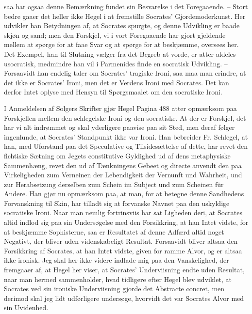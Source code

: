 \documentclass[12pt,a4paper]{article}
\begin{document}
saa har ogsaa denne Bemærkning fundet sin Besvarelse i det Foregaaende. – Stort bedre gaaer det heller ikke Hegel i at fremstille Socrates' Gjordemoderkunst. Her udvikler han Betydningen af, at Socrates spurgte, og denne Udvikling er baade skjøn og sand; men den Forskjel, vi i vort Foregaaende har gjort gjeldende mellem at spørge for at faae Svar og at spørge for at beskjæmme, oversees her. Det Exempel, han til Slutning vælger fra det Begreb at vorde, er atter aldeles usocratisk, medmindre han vil i Parmenides finde en socratisk Udvikling. – Forsaavidt han endelig taler om Socrates' tragiske Ironi, saa maa man erindre, at det ikke er Socrates' Ironi, men det er Verdens Ironi med Socrates. Det kan derfor Intet oplyse med Hensyn til Spørgsmaalet om den socratiske Ironi.

I Anmeldelsen af Solgers Skrifter gjør Hegel Pagina 488 atter opmærksom paa Forskjellen mellem den schlegelske Ironi og den socratiske. At der er Forskjel, det har vi alt indrømmet og skal yderligere paavise paa sit Sted, men deraf følger ingenlunde, at Socrates' Standpunkt ikke var Ironi. Han bebreider Fr. Schlegel, at han, med Uforstand paa det Speculative og Tilsidesættelse af dette, har revet den fichtiske Sætning om Jegets constitutive Gyldighed ud af dens metaphysiske Sammenhæng, revet den ud af Tænkningens Gebeet og directe anvendt den paa Virkeligheden zum Verneinen der Lebendigkeit der Vernunft und Wahrheit, und zur Herabsetzung derselben zum Schein im Subject und zum Scheinen für Andere. Han gjør nu opmærksom paa, at man, for at betegne denne Sandhedens Forvanskning til Skin, har tilladt sig at forvanske Navnet paa den uskyldige socratiske Ironi. Naar man nemlig fortrinsviis har sat Ligheden deri, at Socrates altid indlod sig paa sin Undersøgelse med den Forsikkring, at han Intet vidste, for at beskjæmme Sophisterne, saa er Resultatet af denne Adfærd altid noget Negativt, der bliver uden videnskabeligt Resultat. Forsaavidt bliver altsaa den Forsikkring af Socrates, at han Intet vidste, given for ramme Alvor, og er altsaa ikke ironisk. Jeg skal her ikke videre indlade mig paa den Vanskelighed, der fremgaaer af, at Hegel her viser, at Socrates' Underviisning endte uden Resultat, naar man hermed sammenholder, hvad tidligere efter Hegel blev udviklet, at Socrates ved sin ironiske Underviisning gjorde det Abstracte concret, men derimod skal jeg lidt udførligere undersøge, hvorvidt det var Socrates Alvor med sin Uvidenhed.
\end{document}
